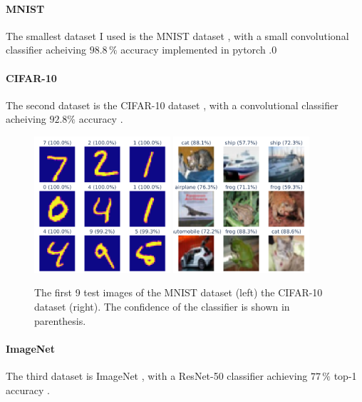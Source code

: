 \documentclass[]{scrarticle}
\begin{document}
\paragraph{MNIST}
The smallest dataset I used is the MNIST dataset \cite{LeCun1998GradientbasedLA},
with a small convolutional classifier acheiving $98.8\,\%$ accuracy implemented in pytorch \cite{tuomaso2022trainmnistfast}.0

\paragraph{CIFAR-10}
The second dataset is the CIFAR-10 dataset \cite{Krizhevsky2009LearningML},
with a convolutional classifier acheiving $92.8 \%$ accuracy \cite{999912022cifar10fastsimple}.

\begin{figure}[h]
  \centering
  \includegraphics[width=0.45\textwidth]{images/sample_MNIST.png}
  \includegraphics[width=0.45\textwidth]{images/sample_CIFAR10.png}
  \caption{
    The first 9 test images of
    the MNIST dataset (left)
    the CIFAR-10 dataset (right).
    The confidence of the classifier is shown in parenthesis.}
  \label{fig:mnist_cifar10_samples}
\end{figure}


\paragraph{ImageNet}
The third dataset is ImageNet \cite{Deng2009ImageNetAL}, with a ResNet-50 classifier
achieving $77\,\%$ top-1 accuracy \cite{He2015DeepRL}.
\end{document}
